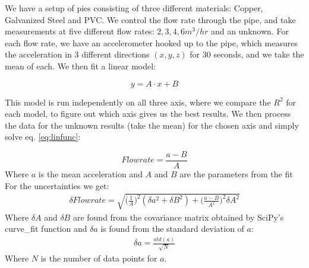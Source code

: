 We have a setup of pies consisting of three different materials: Copper, Galvanized Steel and PVC. We control the flow rate through the pipe, and take measurements at five different flow rates: $2, 3, 4, 6 m^3/hr$ and an unknown. For each flow rate, we have an accelerometer hooked up to the pipe, which measures the acceleration in 3 different directions $(x, y, z)$ for 30 seconds, and we take the mean of each. We then fit a linear model:

\begin{equation}
    y = A\cdot x + B
    \label{eq:linfunc}
\end{equation}

This model is run independently on all three axis, where we compare the $R^2$ for each model, to figure out which axis gives us the best results. We then process the data for the unknown results (take the mean) for the chosen axis and simply solve eq. \ref{eq:linfunc}:

\begin{equation}
    Flowrate = \frac{a-B}{A}
\end{equation}
Where $a$ is the mean acceleration and $A$ and $B$ are the  parameters from the fit
For the uncertainties we get:
\begin{eqnarray}
    \delta Flowrate = \sqrt{ \bigg(\frac{1}{A}\bigg)^2 (\delta a^2 + \delta B^2) + \bigg(\frac{a-B}{A^2}\bigg)^2 \delta A^2}
    \label{eq:Uncertainty}
\end{eqnarray}
Where $\delta A$ and $\delta B$ are found from the covariance matrix obtained by SciPy's curve\_fit function and $\delta a$ is found from the standard deviation of $a$:
\begin{eqnarray}
    \delta a = \frac{std(a)}{\sqrt{N}}
    \label{eq:deltaa}
\end{eqnarray}
Where $N$ is the number of data points for $a$.